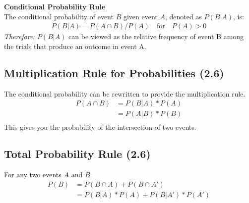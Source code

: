 \documentclass[../INDE315.tex]{subfiles}
\begin{document}
\begin{defn}
    \textbf{Conditional Probability Rule} \\
    The conditional probability of event $B$ given event $A$, denoted as $P(B|A)$, is: 
        \begin{equation*}
            \begin{aligned}
                P(B|A) = P(A \cap B) / P(A) \quad \text{for} \quad P(A) > 0 
            \end{aligned}
        \end{equation*}
    \emph{Therefore}, $P(B|A)$ can be viewed as the relative frequency of event B among the trials that produce an outcome in event A. 
\end{defn}

\subsection*{Multiplication Rule for Probabilities (2.6)}
The conditional probability can be rewritten to provide the multiplication rule.
    \begin{equation*}
        \begin{aligned}
            P(A \cap B) &= P(B|A) * P(A) \\
                    &= P(A|B) * P(B) \\
        \end{aligned}
    \end{equation*} 
This gives you the probability of the intersection of two events.

\subsection*{Total Probability Rule (2.6)}
For any two events $A$ and $B$:
    \begin{equation*}
        \begin{aligned}
            P(B) &= P(B \cap A) + P(B \cap A') \\
                &= P(B|A) * P(A) + P(B|A') * P(A')
        \end{aligned}
    \end{equation*} 
\end{document}
